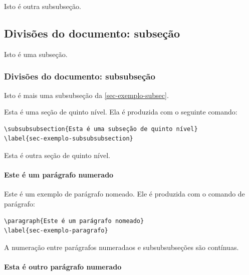Isto é outra subsubseção.

\subsection{Divisões do documento: subseção}\label{sec-exemplo-subsec}

Isto é uma subseção.

\subsubsection{Divisões do documento: subsubseção}

Isto é mais uma subsubseção da \autoref{sec-exemplo-subsec}.


\label{sec-exemplo-subsubsubsection}

Esta é uma seção de quinto nível. Ela é produzida com o seguinte comando:

\begin{verbatim}
\subsubsubsection{Esta é uma subseção de quinto nível}
\label{sec-exemplo-subsubsubsection}
\end{verbatim}

\label{sec-exemplo-subsubsubsection-outro}

Esta é outra seção de quinto nível.


\paragraph{Este é um parágrafo numerado}\label{sec-exemplo-paragrafo}

Este é um exemplo de parágrafo nomeado. Ele é produzida com o comando de
parágrafo:

\begin{verbatim}
\paragraph{Este é um parágrafo nomeado}
\label{sec-exemplo-paragrafo}
\end{verbatim}

A numeração entre parágrafos numeradaos e subsubsubseções são contínuas.

\paragraph{Esta é outro parágrafo numerado}\label{sec-exemplo-paragrafo-outro}

